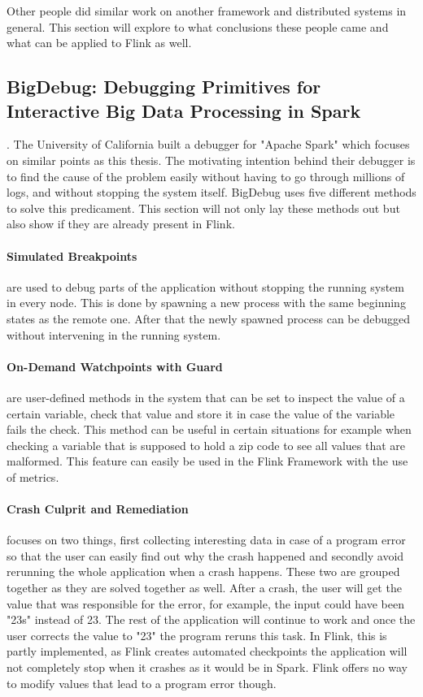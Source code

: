Other people did similar work on another framework and distributed systems in general. This section will explore to what conclusions these people came and what can be applied to Flink as well.

\subsection{BigDebug: Debugging Primitives for Interactive Big Data Processing in Spark}

\cite{Gulzar:2016:BDP:2884781.2884813}. The University of California built a debugger for "Apache Spark" which focuses on similar points as this thesis. The motivating intention behind their debugger is to find the cause of the problem easily without having to go through millions of logs, and without stopping the system itself. BigDebug uses five different methods to solve this predicament. This section will not only lay these methods out but also show if they are already present in Flink.

\paragraph{Simulated Breakpoints} are used to debug parts of the application without stopping the running system in every node. This is done by spawning a new process with the same beginning states as the remote one. After that the newly spawned process can be debugged without intervening in the running system.

\paragraph{On-Demand Watchpoints with Guard} are user-defined methods in the system that can be set to inspect the value of a certain variable, check that value and store it in case the value of the variable fails the check. This method can be useful in certain situations for example when checking a variable that is supposed to hold a zip code to see all values that are malformed. This feature can easily be used in the Flink Framework with the use of metrics.

\paragraph{Crash Culprit and Remediation} focuses on two things, first collecting interesting data in case of a program error so that the user can easily find out why the crash happened and secondly avoid rerunning the whole application when a crash happens. These two are grouped together as they are solved together as well. After a crash, the user will get the value that was responsible for the error, for example, the input could have been "23s" instead of 23. The rest of the application will continue to work and once the user corrects the value to "23" the program reruns this task. In Flink, this is partly implemented, as Flink creates automated checkpoints the application will not completely stop when it crashes as it would be in Spark. Flink offers no way to modify values that lead to a program error though.


